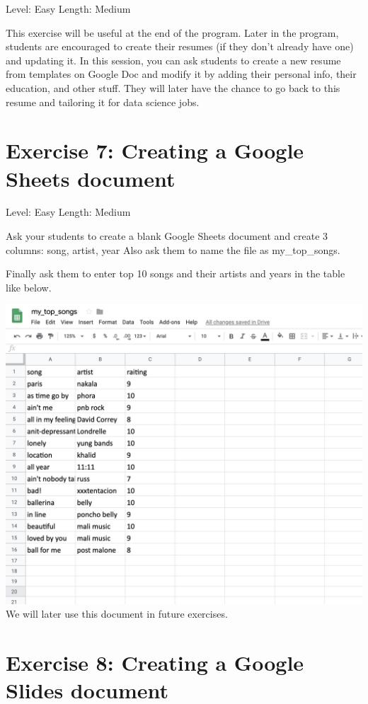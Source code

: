 \documentclass[]{book}
\begin{document}
Level: Easy
Length: Medium

This exercise will be useful at the end of the program. Later in the program, students are encouraged to create their resumes (if they don't already have one) and updating it. In this session, you can ask students to create a new resume from templates on Google Doc and modify it by adding their personal info, their education, and other stuff. They will later have the chance to go back to this resume and tailoring it for data science jobs.

\hypertarget{exercise-7-creating-a-google-sheets-document}{%
\section*{Exercise 7: Creating a Google Sheets document}\label{exercise-7-creating-a-google-sheets-document}}

Level: Easy
Length: Medium

Ask your students to create a blank Google Sheets document and create 3 columns: song, artist, year Also ask them to name the file as my\_top\_songs.

Finally ask them to enter top 10 songs and their artists and years in the table like below.

\includegraphics{./images/top_ten_songs.png}
We will later use this document in future exercises.

\hypertarget{exercise-8-creating-a-google-slides-document}{%
\section*{Exercise 8: Creating a Google Slides document}\label{exercise-8-creating-a-google-slides-document}}
\end{document}
